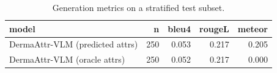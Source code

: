 \begin{table}
\caption{Generation metrics on a stratified test subset.}
\label{tab:generation_real}
\begin{tabular}{lrrrr}
\toprule
model & n & bleu4 & rougeL & meteor \\
\midrule
DermaAttr-VLM (predicted attrs) & 250 & 0.053 & 0.217 & 0.205 \\
DermaAttr-VLM (oracle attrs) & 250 & 0.052 & 0.217 & 0.000 \\
\bottomrule
\end{tabular}
\end{table}

